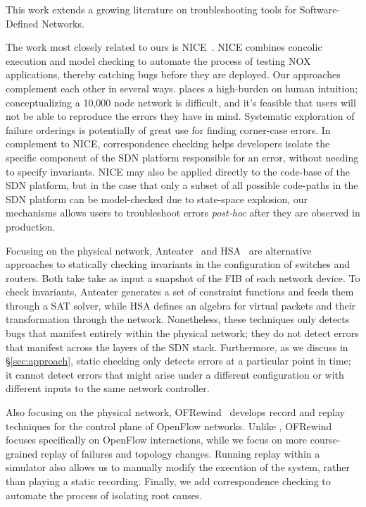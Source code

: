 This work extends a growing literature on troubleshooting tools for
Software-Defined Networks.
    
The work most closely related to ours is NICE~\cite{nice}. NICE combines concolic execution
and model checking to automate the process of testing NOX applications,
thereby catching bugs before
they are deployed. Our approaches complement each other in several ways. 
\Simulator{} places a high-burden on human intuition; conceptualizing
a 10,000 node network is difficult, and it's feasible that users will not be able 
to reproduce the errors they have in mind. Systematic exploration of failure orderings 
is potentially of great use for finding corner-case errors.
In complement to NICE, correspondence checking helps developers isolate the
specific component of the SDN platform responsible for an error, without needing to specify invariants.
NICE may also be applied directly to the code-base of the SDN platform, but in the case that only a subset
of all possible code-paths in the SDN platform can be model-checked due to state-space explosion, 
our mechanisms allows users to troubleshoot errors 
{\it post-hoc} after they are observed in production.

Focusing on the physical network, Anteater~\cite{anteater} and HSA~\cite{hsa}
are alternative approaches to statically checking invariants in the
configuration of switches and routers. Both take take as input a snapshot of
the FIB of each network device. To check invariants, Anteater generates a set of constraint functions and feeds them through a SAT
solver, while HSA defines an algebra for virtual packets and
their transformation through the network. Nonetheless, these techniques
only detects bugs that manifest entirely within the physical network;  
they do not detect errors that manifest across the layers of the SDN stack.
Furthermore, as we discuss in \S\ref{sec:approach},
static checking only detects errors at a particular point in time; it cannot 
detect errors that might arise under a different configuration or with different
inputs to the same network controller.

Also focusing on the physical network, OFRewind~\cite{ofrewind} develops
record and replay techniques for the control plane of OpenFlow networks.
Unlike \simulator, OFRewind focuses specifically on OpenFlow
interactions, while we focus on more course-grained replay of
failures and topology changes. Running replay within a simulator also allows
us to manually modify the execution of the system, rather than playing a
static recording. Finally, we add correspondence checking to automate the
process of isolating root causes.

